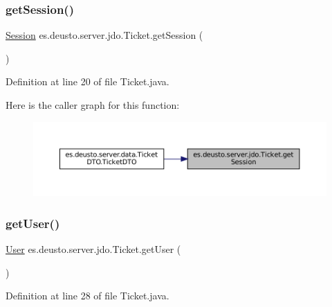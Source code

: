 \subsubsection{\texorpdfstring{getSession()}{getSession()}}
{\footnotesize\ttfamily \mbox{\hyperlink{classes_1_1deusto_1_1server_1_1jdo_1_1_session}{Session}} es.\+deusto.\+server.\+jdo.\+Ticket.\+get\+Session (\begin{DoxyParamCaption}{ }\end{DoxyParamCaption})}



Definition at line 20 of file Ticket.\+java.

Here is the caller graph for this function\+:\nopagebreak
\begin{figure}[H]
\begin{center}
\leavevmode
\includegraphics[width=350pt]{classes_1_1deusto_1_1server_1_1jdo_1_1_ticket_a60d6aebd66fee1d5d0ebde52540dcac9_icgraph}
\end{center}
\end{figure}
\mbox{\label{classes_1_1deusto_1_1server_1_1jdo_1_1_ticket_a6c4819e9c6938564059c7957bf6a01d1}} 
\subsubsection{\texorpdfstring{getUser()}{getUser()}}
{\footnotesize\ttfamily \mbox{\hyperlink{classes_1_1deusto_1_1server_1_1jdo_1_1_user}{User}} es.\+deusto.\+server.\+jdo.\+Ticket.\+get\+User (\begin{DoxyParamCaption}{ }\end{DoxyParamCaption})}



Definition at line 28 of file Ticket.\+java.

\mbox{\label{classes_1_1deusto_1_1server_1_1jdo_1_1_ticket_a175ab896194b8a3734e335ff63440151}} 
